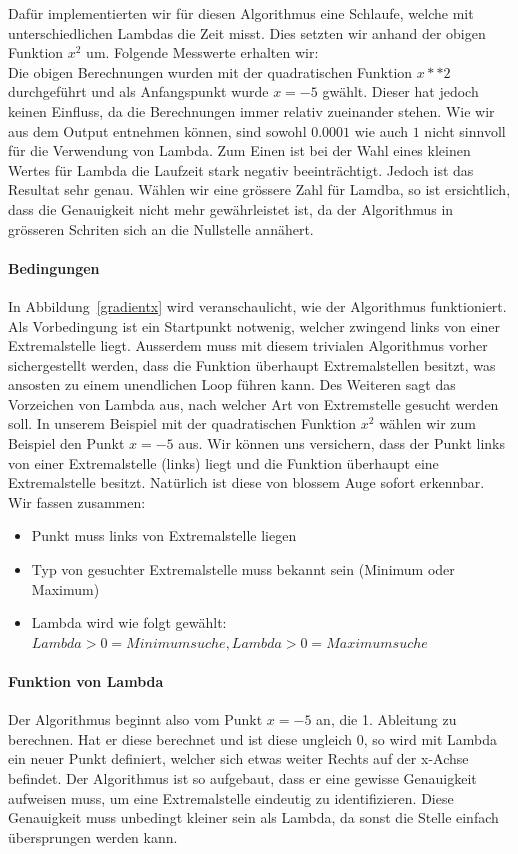 \documentclass[10pt]{article}         %
\begin{document}
Dafür implementierten wir für diesen Algorithmus eine Schlaufe, welche mit unterschiedlichen Lambdas die Zeit misst. Dies setzten wir anhand der obigen Funktion $x^2$ um. Folgende Messwerte erhalten wir:\\




Die obigen Berechnungen wurden mit der quadratischen Funktion $x**2$ durchgeführt und als Anfangspunkt wurde $x=-5$ gwählt. Dieser hat jedoch keinen Einfluss, da die Berechnungen immer relativ zueinander stehen. 
Wie wir aus dem Output entnehmen können, sind sowohl $0.0001$ wie auch $1$ nicht sinnvoll für die Verwendung von Lambda. Zum Einen ist bei der Wahl eines kleinen Wertes für Lambda die Laufzeit stark negativ beeinträchtigt. Jedoch ist das Resultat sehr genau. Wählen wir eine grössere Zahl für Lamdba, so ist ersichtlich, dass die Genauigkeit nicht mehr gewährleistet ist, da der Algorithmus in grösseren Schriten sich an die Nullstelle annähert. 

\paragraph{Bedingungen}
In Abbildung~\ref{gradientx} wird veranschaulicht, wie der Algorithmus funktioniert. Als Vorbedingung ist ein Startpunkt notwenig, welcher zwingend links von einer Extremalstelle liegt. Ausserdem muss mit diesem trivialen Algorithmus vorher sichergestellt werden, dass die Funktion überhaupt Extremalstellen besitzt, was ansosten zu einem unendlichen Loop führen kann. Des Weiteren sagt das Vorzeichen von Lambda aus, nach welcher Art von Extremstelle gesucht werden soll. In unserem Beispiel mit der quadratischen Funktion $x^2$ wählen wir zum Beispiel den Punkt $x=-5$ aus. Wir können uns versichern, dass der Punkt links von einer Extremalstelle (links) liegt und die Funktion überhaupt eine Extremalstelle besitzt. Natürlich ist diese von blossem Auge sofort erkennbar. 
Wir fassen zusammen:
\begin{itemize}
\item Punkt muss links von Extremalstelle liegen
\item Typ von gesuchter Extremalstelle muss bekannt sein (Minimum oder Maximum)
\item Lambda wird wie folgt gewählt: $Lambda > 0 = Minimumsuche, Lambda > 0 = Maximumsuche$
\end{itemize}

\paragraph{Funktion von Lambda}
Der Algorithmus beginnt also vom Punkt $x=-5$ an, die 1. Ableitung zu berechnen. Hat er diese berechnet und ist diese ungleich 0, so wird mit Lambda ein neuer Punkt definiert, welcher sich etwas weiter Rechts auf der x-Achse befindet. Der Algorithmus ist so aufgebaut, dass er eine gewisse Genauigkeit aufweisen muss, um eine Extremalstelle eindeutig zu identifizieren. Diese Genauigkeit muss unbedingt kleiner sein als Lambda, da sonst die Stelle einfach übersprungen werden kann.
\end{document}
